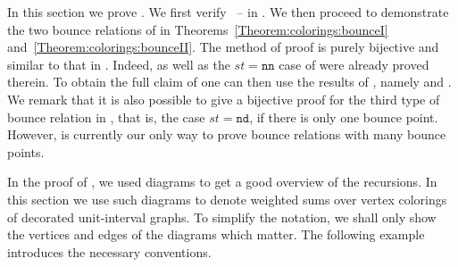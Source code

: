 \documentclass[reqno]{amsart}
\newcommand{\dstep}{\texttt{d}}
\newcommand{\nstep}{\texttt{n}}
\begin{document}
In this section we prove .
We first verify 
~--
 in .
We then proceed to demonstrate the two bounce relations 
of  in Theorems~\ref{Theorem:colorings:bounceI} and~\ref{Theorem:colorings:bounceII}.
%
The method of proof is purely bijective and similar to that in \cite[Prop.~18]{Alexandersson2019llt}.
Indeed,  as well as the $st=\nstep\nstep$ case of  were already proved therein.
To obtain the full claim of  one can then use the results of , namely  and .
We remark that it is also possible to give a bijective proof for the third type of bounce relation in , that is, the case $st=\nstep\dstep$, if there is only one bounce point.
However,  is currently our only way to prove bounce relations with many bounce points.


In the proof of ,
we used diagrams to get a good overview of the recursions.
In this section we use such diagrams to denote 
weighted sums over vertex colorings of decorated unit-interval graphs. 
To simplify the notation, we shall only 
show the vertices and edges of the diagrams which matter.
The following example introduces the necessary conventions.
\end{document}

